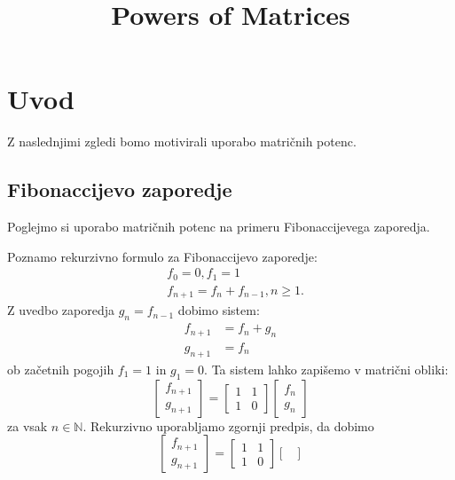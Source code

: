 \documentclass[mat1]{fmfdelo}
\title{Powers of Matrices}
\begin{document}
\section{Uvod}
Z naslednjimi zgledi bomo motivirali uporabo matričnih potenc.
\subsection{Fibonaccijevo zaporedje}

Poglejmo si uporabo matričnih potenc na primeru Fibonaccijevega zaporedja.
\begin{zgled} 
    Poznamo rekurzivno formulo za Fibonaccijevo zaporedje:
    \begin{align*}
        &f_0 = 0, f_1 = 1 \\
        &f_{n+1} = f_n + f_{n-1}, n \geq 1.
    \end{align*}
    Z uvedbo zaporedja $g_n = f_{n-1}$ dobimo sistem:
    \begin{align*}
        f_{n+1} &= f_n + g_n \\
        g_{n+1} &= f_n
    \end{align*}
    ob začetnih pogojih $f_1 = 1$ in $g_1 = 0$. Ta sistem lahko zapišemo v matrični obliki:
    \begin{equation*}
        \begin{bmatrix}
            f_{n+1} \\
            g_{n+1}
        \end{bmatrix}
        =
        \begin{bmatrix}
            1 & 1 \\
            1 & 0
        \end{bmatrix}
        \begin{bmatrix}
            f_n \\
            g_n
        \end{bmatrix}
    \end{equation*}
    za vsak $n \in \mathbb{N}$. Rekurzivno uporabljamo zgornji predpis, da dobimo
    \begin{equation*}
        \begin{bmatrix}
            f_{n+1} \\
            g_{n+1}
        \end{bmatrix}
        =
        \begin{bmatrix}
            1 & 1 \\
            1 & 0
        \end{bmatrix}
        \begin{bmatrix}

\end{bmatrix}
\end{equation*}
\end{zgled}
\end{document}
